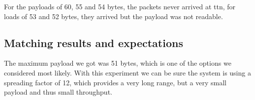 		For the payloads of 60, 55 and 54 bytes, the packets never arrived at ttn, for loads of 53 and 52 bytes, they arrived but the payload was not readable.

	\subsection{Matching results and expectations}
		The maximum payload we got was 51 bytes, which is one of the options we considered most likely. With this experiment we can be sure the system is using a spreading factor of 12, which provides a very long range, but a very small payload and thus small throughput.

